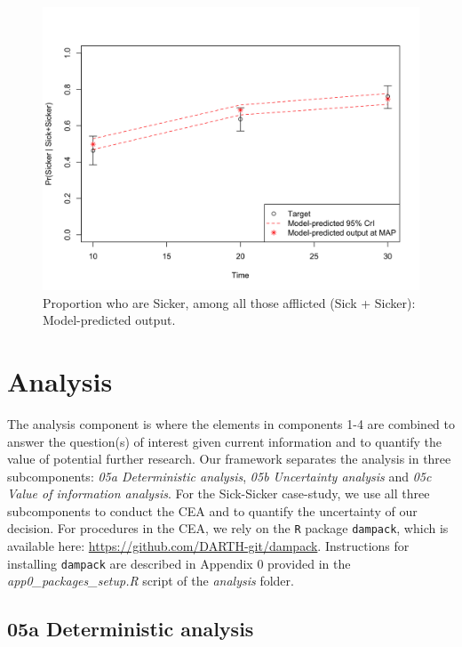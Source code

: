 \documentclass[]{book}
\begin{document}
\begin{figure}

{\centering \includegraphics[width=33.33in]{../figs/04_posterior_vs_targets_proportion_sicker} 

}

\caption{Proportion who are Sicker, among all those afflicted (Sick + Sicker): Model-predicted output.}\label{fig:04-proportion}
\end{figure}

\chapter{Analysis}\label{analysis}

The analysis component is where the elements in components 1-4 are
combined to answer the question(s) of interest given current information
and to quantify the value of potential further research. Our framework
separates the analysis in three subcomponents: \emph{05a Deterministic
analysis}, \emph{05b Uncertainty analysis} and \emph{05c Value of
information analysis}. For the Sick-Sicker case-study, we use all three
subcomponents to conduct the CEA and to quantify the uncertainty of our
decision. For procedures in the CEA, we rely on the \texttt{R} package
\texttt{dampack}, which is available here:
\url{https://github.com/DARTH-git/dampack}. Instructions for installing
\texttt{dampack} are described in Appendix 0 provided in the
\emph{app0\_packages\_setup.R} script of the \emph{analysis} folder.

\section{05a Deterministic analysis}\label{Deterministic-analysis}
\end{document}
